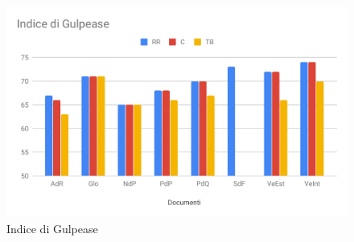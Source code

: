 \begin{figure}[H]
	\centering
	\includegraphics[scale=0.5]{res/images/gulpease.pdf}
	\caption{Indice di Gulpease}
\end{figure}

